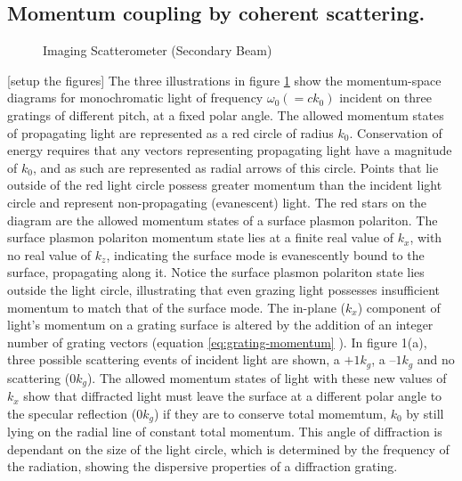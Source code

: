 \documentclass[oneside,10pt,a4paper]{book}
\begin{document}
\subsection{Momentum coupling by coherent scattering. }
\begin{figure}
\centering
		\begin{subfigure}[]{0.48\textwidth}
		\centering
		\end{subfigure}
		\begin{subfigure}[]{0.48\textwidth}
		\centering
		\end{subfigure}
		\begin{subfigure}[]{0.48\textwidth}
			\centering
		\end{subfigure}
	\caption{Imaging Scatterometer (Secondary Beam)\label{fig:grating-indexitices}}
\end{figure}
[setup the figures]
The three illustrations in figure \ref{fig:grating-indexitices} show the momentum-space diagrams for monochromatic light of frequency $\omega_0 (=ck_0)$ incident on three gratings of different pitch, at a fixed polar angle. 
The allowed momentum states of propagating light are represented as a red circle of radius $k_0$. Conservation of energy requires that any vectors representing propagating light have a magnitude of $k_0$, and as such are represented as radial arrows of this circle. Points that lie outside of the red light circle possess greater momentum than the incident light circle and represent non-propagating (evanescent) light. The red stars on the diagram are the allowed momentum states of a surface plasmon polariton. The surface plasmon polariton momentum state lies at a finite real value of $k_x$, with no real value of $k_z$, indicating the surface mode is evanescently bound to the surface, propagating along it. Notice the surface plasmon polariton state lies outside the light circle, illustrating that even grazing light possesses insufficient momentum to match that of the surface mode.
The in-plane ($k_x$) component of light’s momentum on a grating surface is altered by the addition of an integer number of grating vectors (equation \ref{eq:grating-momentum} ).  In figure 1(a), three possible scattering events of incident light are shown, a $+1k_g$, a $–1k_g$ and no scattering ($0k_g$).  The allowed momentum states of light with these new values of $k_x$ show that diffracted light must leave the surface at a different polar angle to the specular reflection ($0k_g$) if they are to conserve total momemtum, $k_0$ by still lying on the radial line of constant total momentum. This angle of diffraction is dependant on the size of the light circle, which is determined by the frequency of the radiation, showing the dispersive properties of a diffraction grating.
\end{document}
